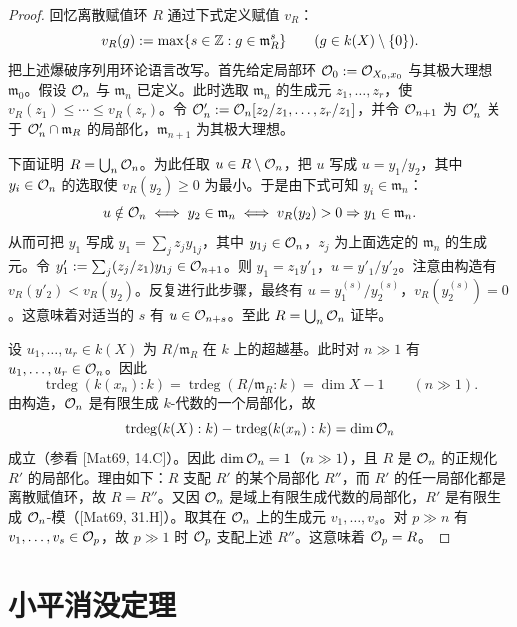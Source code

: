 \begin{proof}
回忆离散赋值环 $R$ 通过下式定义赋值 $v_R$：
\[
v_R(g):=\max\{s\in\mathbb{Z}: g\in\mathfrak m_R^s\}\qquad(g\in k(X)\setminus\{0\}).
\]
把上述爆破序列用环论语言改写。首先给定局部环 $\mathcal{O}_0:=\mathcal{O}_{X_0,x_0}$ 与其极大理想 $\mathfrak m_0$。假设 $\mathcal{O}_n$ 与 $\mathfrak m_n$ 已定义。此时选取 $\mathfrak m_n$ 的生成元 $z_1,\dots,z_r$，使 $v_R(z_1)\le\cdots\le v_R(z_r)$。令 $\mathcal{O}'_n:=\mathcal{O}_n[z_2/z_1,\dots,z_r/z_1]$，并令 $\mathcal{O}_{n+1}$ 为 $\mathcal{O}'_n$ 关于 $\mathcal{O}'_n\cap\mathfrak m_R$ 的局部化，$\mathfrak m_{n+1}$ 为其极大理想。

下面证明 $R=\bigcup_n\mathcal{O}_n$。为此任取 $u\in R\setminus\mathcal{O}_n$，把 $u$ 写成 $u=y_1/y_2$，其中 $y_i\in\mathcal{O}_n$ 的选取使 $v_R(y_2)\ge 0$ 为最小。于是由下式可知 $y_i\in\mathfrak m_n$：
\[
u\notin\mathcal{O}_n\iff y_2\in\mathfrak m_n\iff v_R(y_2)>0\Rightarrow y_1\in\mathfrak m_n.
\]
从而可把 $y_1$ 写成 $y_1=\sum_j z_jy_{1j}$，其中 $y_{1j}\in\mathcal{O}_n$，$z_j$ 为上面选定的 $\mathfrak m_n$ 的生成元。令 $y'_1:=\sum_j(z_j/z_1)y_{1j}\in\mathcal{O}_{n+1}$。则 $y_1=z_1y'_1$，$u=y'_1/y'_2$。注意由构造有 $v_R(y'_2)<v_R(y_2)$。反复进行此步骤，最终有 $u=y_1^{(s)}/y_2^{(s)}$，$v_R(y_2^{(s)})=0$。这意味着对适当的 $s$ 有 $u\in\mathcal{O}_{n+s}$。至此 $R=\bigcup_n\mathcal{O}_n$ 证毕。

设 $u_1,\dots,u_r\in k(X)$ 为 $R/\mathfrak m_R$ 在 $k$ 上的超越基。此时对 $n\gg 1$ 有 $u_1,\dots,u_r\in\mathcal{O}_n$。因此
\[
\operatorname{trdeg}(k(x_n):k)=\operatorname{trdeg}(R/\mathfrak m_R:k)=\dim X-1\qquad(n\gg 1).
\]
由构造，$\mathcal{O}_n$ 是有限生成 $k$-代数的一个局部化，故
\[
\operatorname{trdeg}(k(X):k)-\operatorname{trdeg}(k(x_n):k)=\dim\mathcal{O}_n
\]
成立（参看 [Mat69, 14.C]）。因此 $\dim\mathcal{O}_n=1$（$n\gg 1$），且 $R$ 是 $\mathcal{O}_n$ 的正规化 $R'$ 的局部化。理由如下：$R$ 支配 $R'$ 的某个局部化 $R''$，而 $R'$ 的任一局部化都是离散赋值环，故 $R=R''$。又因 $\mathcal{O}_n$ 是域上有限生成代数的局部化，$R'$ 是有限生成 $\mathcal{O}_n$-模（[Mat69, 31.H]）。取其在 $\mathcal{O}_n$ 上的生成元 $v_1,\dots,v_s$。对 $p\gg n$ 有 $v_1,\dots,v_s\in\mathcal{O}_p$，故 $p\gg 1$ 时 $\mathcal{O}_p$ 支配上述 $R''$。这意味着 $\mathcal{O}_p=R$。
\end{proof}


\section{小平消没定理}


